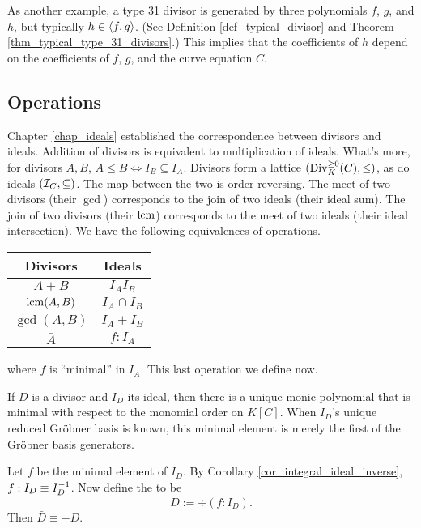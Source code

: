 As another example, a type 31 divisor is generated by three polynomials $f$, $g$, and $h$,
but typically $h \in \pid{f,g}$.
(See Definition \ref{def_typical_divisor} and Theorem \ref{thm_typical_type_31_divisors}.)
This implies that the coefficients of $h$ depend on the coefficients of $f$, $g$, and the curve equation $C$.




\subsection{Operations}

Chapter \ref{chap_ideals} established the correspondence between divisors and ideals.
Addition of divisors is equivalent to multiplication of ideals.
What's more, for divisors $A, B$, $A \leq B \iff I_B \subseteq I_A$.
Divisors form a lattice $(\Div_K^{\geq 0}(C), \leq)$, as do ideals $(\cal I_C, \subseteq)$.
The map between the two is order-reversing.
The meet of two divisors (their $\gcd$) corresponds to the join of two ideals (their ideal sum).
The join of two divisors (their $\lcm$) corresponds to the meet of two ideals (their ideal intersection).
We have the following equivalences of operations.
\begin{center}
  \begin{tabular}{c|c}
    Divisors & Ideals \\
    \hline
    $A + B$ & $I_A I_B$ \\
    $\lcm(A,B)$ & $I_A \cap I_B$ \\
    $\gcd(A,B)$ & $I_A + I_B$ \\
    $\bar A$ & $f : I_A$
  \end{tabular}
\end{center}
where $f$ is ``minimal'' in $I_A$.
This last operation we define now.

If $D$ is a divisor and $I_D$ its ideal,
then there is a unique monic polynomial that is minimal with respect to the monomial order on $K[C]$.
When $I_D$'s unique reduced Gr\"obner basis is known,
this minimal element is merely the first of the Gr\"obner basis generators.

Let $f$ be the minimal element of $I_D$.
By Corollary \ref{cor_integral_ideal_inverse}, $f : I_D \equiv I_D\inv$.
Now define the  to be
  \[ \bar D := \div(f : I_D). \]
Then $\bar D \equiv -D$.

